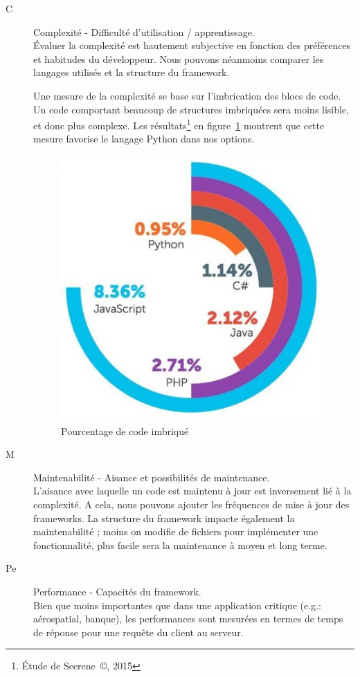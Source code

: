 \documentclass{EPL-master-thesis-covers-FR}
\begin{document}
					\begin{description}
						\item[C] Complexité - Difficulté d'utilisation / apprentissage. \hfill \\
							\'Evaluer la complexité est hautement subjective en fonction des préférences et habitudes du développeur. Nous pouvons néanmoins comparer les langages utilisés et la structure du framework.

							Une mesure de la complexité se base sur l'imbrication des blocs de code. Un code comportant beaucoup de structures imbriquées sera moins lisible, et donc plus complexe. Les résultats\footnote{\'Etude de Seerene~\copyright, 2015} en figure~\ref{fig:complexity} montrent que cette mesure favorise le langage Python dans nos options.

							\begin{figure}
									\centering
									\includegraphics[width=.6\textwidth]{images/complexity}
									\caption{Pourcentage de code imbriqué}
									\label{fig:complexity}
							\end{figure}

				    \item[M] Maintenabilité - Aisance et possibilités de maintenance. \hfill \\
							L'aisance avec laquelle un code est maintenu à jour est inversement lié à la complexité. A cela, nous pouvons ajouter les fréquences de mise à jour des frameworks. La structure du framework impacte également la maintenabilité ; moins on modifie de fichiers pour implémenter une fonctionnalité, plus facile sera la maintenance à moyen et long terme.

				    \item[Pe] Performance - Capacités du framework. \hfill \\
							Bien que moins importantes que dans une application critique (e.g.: aérospatial, banque), les performances sont mesurées en termes de temps de réponse pour une requête du client au serveur.


\end{description}
\end{document}
